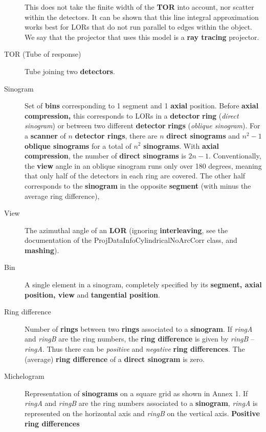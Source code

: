 \documentclass{article}
\begin{document}
\begin{description}
This does not take the finite width of the \textbf{TOR} into account, 
nor scatter within the detectors. It can be shown that this line 
integral approximation works best for LORs that do not run parallel 
to edges within the object. We say that the projector that uses 
this model is a \textbf{ray tracing} projector.
\item[TOR (Tube of response)] 
Tube joining two \textbf{detectors}. 
\item[Sinogram] 
Set of \textbf{bins} corresponding to 1 segment and 1 \textbf{axial} position. 
Before \textbf{axial compression,} this corresponds to LORs in a \textbf{detector} \textbf{ring} 
(\textit{direct} \textit{sinogram}) or between two different \textbf{detector} \textbf{rings} 
(\textit{oblique} \textit{sinogram}). For a \textbf{scanner} of $n$ \textbf{detector 
rings}, there are $n$ \textbf{direct sinograms} and $n^2-1$ \textbf{oblique 
sinograms} for a total of $n^2$ \textbf{sinograms}. With \textbf{axial 
compression}, the number of \textbf{direct sinograms} is $2n-1$. Conventionally, 
the \textbf{view} angle in an oblique sinogram runs only over 180 
degrees, meaning that only half of the detectors in each ring 
are covered. The other half corresponds to the \textbf{sinogram} in 
the opposite \textbf{segment} (with minus the average ring difference),
\item[View] 
The azimuthal angle of an \textbf{LOR} (ignoring \textbf{interleaving}, 
see the documentation of the ProjDataInfoCylindricalNoArcCorr 
class, and \textbf{mashing}).
\item[Bin] 
A single element in a sinogram, completely specified by its \textbf{segment, 
axial} \textbf{position, view} and \textbf{tangential position}.
\item[Ring difference] 
Number of \textbf{rings} between two \textbf{rings} associated to a \textbf{sinogram}. 
If \textit{ringA} and \textit{ringB} are the ring numbers, the \textbf{ring 
difference} is given by \textit{ringB} -- \textit{ringA}. Thus there can be \textit{positive} 
and \textit{negative} \textbf{ring differences}. \linebreak
The (average) \textbf{ring difference} of a \textbf{direct sinogram} is 
zero.
\item[Michelogram] 
Representation of \textbf{sinograms} on a square grid as shown in 
Annex 1. If \textit{ringA} and \textit{ringB} are the ring numbers associated 
to a \textbf{sinogram}, \textit{ringA} is represented on the horizontal 
axis and \textit{ringB} on the vertical axis. \textbf{Positive ring differences} 

\end{description}
\end{document}
